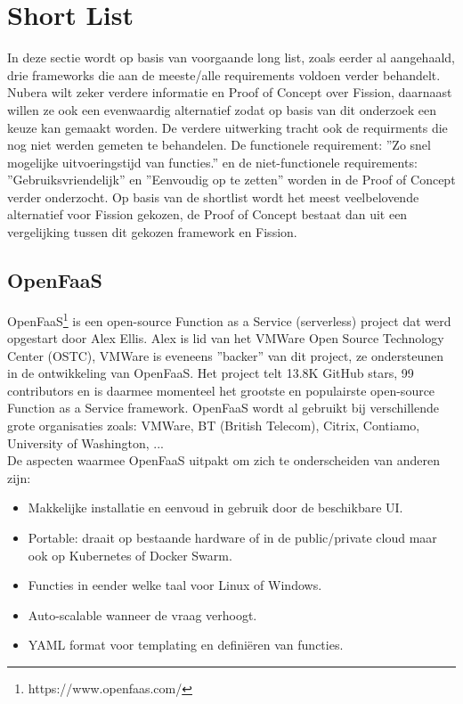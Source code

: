 \section{Short List}
\label{sec:short-list}

In deze sectie wordt op basis van voorgaande long list, zoals eerder al aangehaald, drie frameworks die aan de meeste/alle requirements voldoen verder behandelt. Nubera wilt zeker verdere informatie en Proof of Concept over Fission, daarnaast willen ze ook een evenwaardig alternatief zodat op basis van dit onderzoek een keuze kan gemaakt worden. De verdere uitwerking tracht ook de requirments die nog niet werden gemeten te behandelen. De functionele requirement: ''Zo snel mogelijke uitvoeringstijd van functies.'' en de niet-functionele requirements: ''Gebruiksvriendelijk'' en ''Eenvoudig op te zetten'' worden in de Proof of Concept verder onderzocht. Op basis van de shortlist wordt het meest veelbelovende alternatief voor Fission gekozen, de Proof of Concept bestaat dan uit een vergelijking tussen dit gekozen framework en Fission.


\subsection{OpenFaaS}
OpenFaaS\footnote{https://www.openfaas.com/} is een open-source Function as a Service (serverless) project dat werd opgestart door Alex Ellis. Alex is lid van het VMWare Open Source Technology Center (OSTC), VMWare is eveneens ''backer'' van dit project, ze ondersteunen in de ontwikkeling van OpenFaaS. Het project telt 13.8K GitHub stars, 99 contributors en is daarmee momenteel het grootste en populairste open-source Function as a Service framework. OpenFaaS wordt al gebruikt bij verschillende grote organisaties zoals: VMWare, BT (British Telecom), Citrix, Contiamo, University of Washington, ... 
\\
De aspecten waarmee OpenFaaS uitpakt om zich te onderscheiden van anderen zijn: \autocite{OpenFaaS2019}
\begin{itemize}
    \item Makkelijke installatie en eenvoud in gebruik door de beschikbare UI.
    \item Portable: draait op bestaande hardware of in de public/private cloud maar ook op Kubernetes of Docker Swarm.
    \item Functies in eender welke taal voor Linux of Windows.
    \item Auto-scalable wanneer de vraag verhoogt.
    \item YAML format voor templating en definiëren van functies.
\end{itemize}
